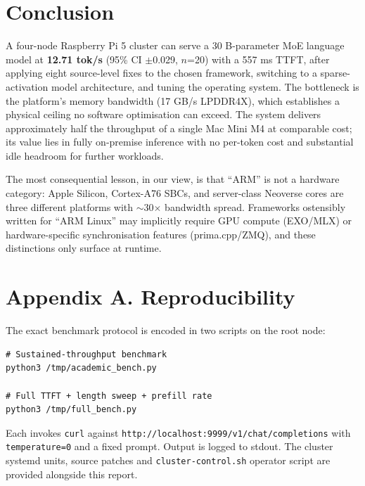 \documentclass[11pt,a4paper]{article}
\begin{document}
\section{Conclusion}

A four-node Raspberry Pi 5 cluster can serve a 30 B-parameter MoE language model at \textbf{12.71 tok/s} (95\% CI $\pm$0.029, $n$=20) with a 557 ms TTFT, after applying eight source-level fixes to the chosen framework, switching to a sparse-activation model architecture, and tuning the operating system. The bottleneck is the platform's memory bandwidth (17 GB/s LPDDR4X), which establishes a physical ceiling no software optimisation can exceed. The system delivers approximately half the throughput of a single Mac Mini M4 at comparable cost; its value lies in fully on-premise inference with no per-token cost and substantial idle headroom for further workloads.

The most consequential lesson, in our view, is that ``ARM'' is not a hardware category: Apple Silicon, Cortex-A76 SBCs, and server-class Neoverse cores are three different platforms with $\sim$30$\times$ bandwidth spread. Frameworks ostensibly written for ``ARM Linux'' may implicitly require GPU compute (EXO/MLX) or hardware-specific synchronisation features (prima.cpp/ZMQ), and these distinctions only surface at runtime.

\section*{Appendix A. Reproducibility}

The exact benchmark protocol is encoded in two scripts on the root node:
\begin{lstlisting}
# Sustained-throughput benchmark
python3 /tmp/academic_bench.py

# Full TTFT + length sweep + prefill rate
python3 /tmp/full_bench.py
\end{lstlisting}
Each invokes \texttt{curl} against \texttt{http://localhost:9999/v1/chat/completions} with \texttt{temperature=0} and a fixed prompt. Output is logged to stdout. The cluster systemd units, source patches and \texttt{cluster-control.sh} operator script are provided alongside this report.
\end{document}
